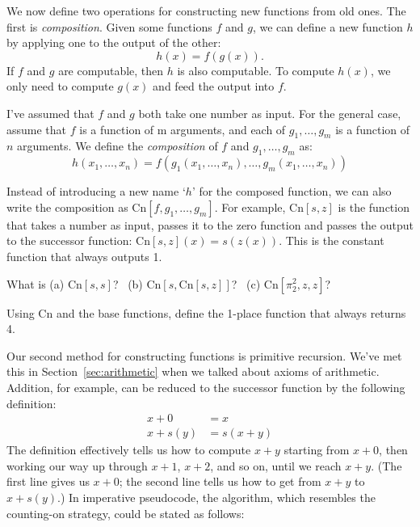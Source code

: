 We now define two operations for constructing new functions from old ones.
The first is \emph{composition}.
Given some functions $f$ and $g$,
we can define a new function $h$ by applying one to the output of the other:
\[
  h(x) = f(g(x)).
\]
\noindent%
If $f$ and $g$ are computable,
then $h$ is also computable.
To compute $h(x)$,
we only need to compute $g(x)$ and feed the output into $f$.

I've assumed that $f$ and $g$ both take one number as input.
For the general case,
assume that $f$ is a function of m arguments,
and each of $g_1, \ldots, g_m$ is a function of $n$ arguments.
We define the \textit{composition} of $f$ and $g_1, \ldots, g_m$ as:
\[
  h(x_1, \ldots, x_n) = f(g_1(x_1, \ldots, x_n), \ldots, g_m(x_1, \ldots, x_n))
\]

Instead of introducing a new name `$h$' for the composed function,
we can also write the composition as $\mathrm{Cn}[f, g_1, \ldots, g_m]$.
For example, $\mathrm{Cn}[s,z]$ is the function that
takes a number as input,
passes it to the zero function and passes the output to the successor function:
$\mathrm{Cn}[s,z](x) = s(z(x))$.
This is the constant function that always outputs 1.

\begin{exercise}
  What is (a) $\mathrm{Cn}[s,s]$? \, (b) $\mathrm{Cn}[s, \mathrm{Cn}[s,z]]$? \,
  (c) $\mathrm{Cn}[\pi^{2}_{2}, z, z]$?
\end{exercise}

\begin{exercise}
  Using $\mathrm{Cn}$ and the base functions,
  define the 1-place function that always returns 4.
\end{exercise}

Our second method for constructing functions is primitive recursion.
We've met this in Section~\ref{sec:arithmetic}
when we talked about axioms of arithmetic.
Addition,
for example,
can be reduced to the successor function by the following definition:
\begin{align*}
   x+0 &= x\\
   x+s(y) &= s(x+y)
\end{align*}
%
The definition effectively tells us how to compute $x+y$
starting from $x+0$,
then working our way up through $x+1$, $x+2$, and so on,
until we reach $x+y$.
(The first line gives us $x+0$;
the second line tells us how to get from $x+y$ to $x+s(y)$.)
In imperative pseudocode,
the algorithm,
which resembles the counting-on strategy,
could be stated as follows:

